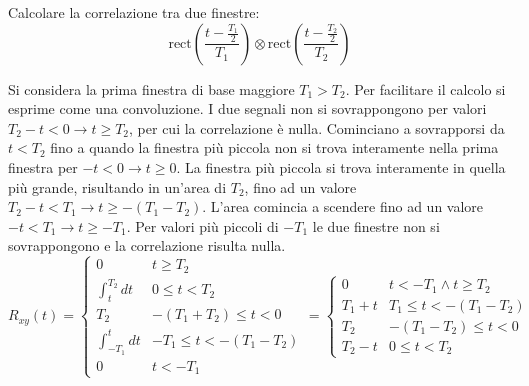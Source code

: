 \documentclass{article}
\numberwithin{equation}{subsection}
\begin{document}
Calcolare la correlazione tra due finestre:
\begin{equation*}
    \mbox{rect}\displaystyle\left(\frac{t-\frac{T_1}{2}}{T_1}\right)\otimes\mbox{rect}\left(\frac{t-\frac{T_2}{2}}{T_2}\right)
\end{equation*}

Si considera la prima finestra di base maggiore $T_1>T_2$. Per facilitare il calcolo si esprime come una convoluzione. I due segnali non si sovrappongono per valori 
$T_2-t<0\to t\geq T_2$, per cui la correlazione è nulla. Cominciano a sovrapporsi da $t<T_2$ fino a quando la finestra più piccola non si trova interamente nella prima 
finestra per $-t<0\to t\geq0$. La finestra più piccola si trova interamente in quella più grande, risultando in un'area di $T_2$, fino ad un valore 
$T_2-t<T_1\to t\geq -(T_1-T_2)$. L'area comincia a scendere fino ad un valore $-t<T_1\to t\geq -T_1$. Per valori più piccoli di $-T_1$ le due finestre non si sovrappongono e la 
correlazione risulta nulla.
\begin{equation*}
    R_{xy}(t)=\begin{cases}
        0&t\geq T_2\\
        \displaystyle\int_t^{T_2}dt& 0\leq t<T_2\\
        T_2& -(T_1+T_2)\leq t<0\\
        \displaystyle\int_{-T_1}^tdt& -T_1\leq t<-(T_1-T_2)\\
        0&t<-T_1
    \end{cases}=\begin{cases}
        0& t<-T_1\land t\geq T_2\\
        T_1+t& T_1\leq t<-(T_1-T_2)\\
        T_2& -(T_1-T_2)\leq t<0\\
        T_2-t &  0\leq t<T_2
    \end{cases}
\end{equation*}
\end{document}
